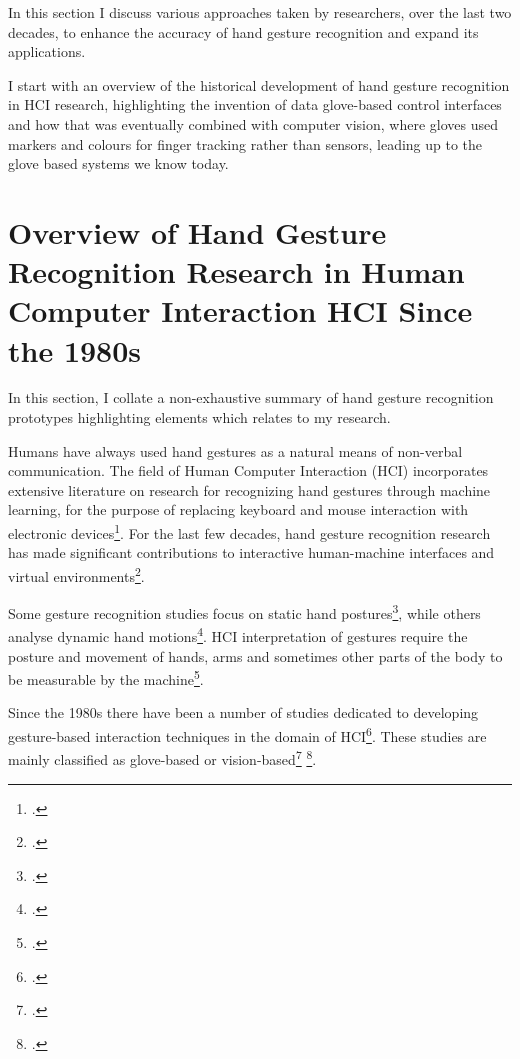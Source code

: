 In this section I discuss various approaches taken by researchers, over the last two decades, to enhance the accuracy of hand gesture recognition and expand its applications.

I start with an overview of the historical development of hand gesture recognition in HCI research, highlighting the invention of data glove-based control interfaces and how that was eventually combined with computer vision, where gloves used markers and colours for finger tracking rather than sensors, leading up to the glove based systems we know today. 

\section{Overview of Hand Gesture Recognition Research in Human Computer Interaction HCI Since the 1980s}

In this section, I collate a non-exhaustive summary of hand gesture recognition prototypes highlighting elements which relates to my research. 

Humans have always used hand gestures as a natural means of non-verbal communication. The field of Human Computer Interaction (HCI) incorporates extensive literature on research for recognizing hand gestures through machine learning, for the purpose of replacing keyboard and mouse interaction with electronic devices\footcite{Takahashi1992}. For the last few decades, hand gesture recognition research has made significant contributions to interactive human-machine interfaces and virtual environments\footcite{Takahashi1992}. 

Some gesture recognition studies focus on static hand postures\footcite{Klboz2015}, while others analyse dynamic hand motions\footcite{Rigoll1997}. HCI interpretation of gestures require the posture and movement of hands, arms and sometimes other parts of the body to be measurable by the machine\footcite{Pavlovic1997}.

Since the 1980s there have been a number of studies dedicated to developing gesture-based interaction techniques in the domain of HCI\footcite{Rautaray2015}. These studies are mainly classified as glove-based or vision-based\footcite{Rautaray2015} \footcite{Pavlovic1997}.

